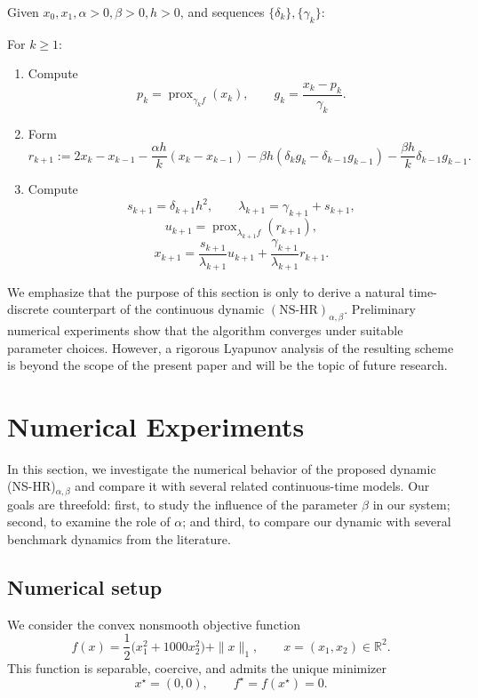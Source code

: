 \documentclass[11pt]{article}
\numberwithin{equation}{section}
\begin{document}
Given $x_0,x_1, \alpha>0, \beta>0, h>0$, and sequences $\{\delta_k\},\{\gamma_k\}$:

For $k\ge1$:

\begin{enumerate}
\item Compute
\[
p_k
=
\operatorname{prox}_{\gamma_k f}(x_k),
\qquad
g_k
=
\frac{x_k-p_k}{\gamma_k}.
\]

\item Form
\[
r_{k+1}
:=
2x_k-x_{k-1}
-\frac{\alpha h}{k}(x_k-x_{k-1})
-\beta h(\delta_k g_k-\delta_{k-1}g_{k-1})-\frac{\beta h}{k}\delta_{k-1}g_{k-1}.
\]

\item Compute
\[
s_{k+1}
=
\delta_{k+1}h^2,
\qquad
\lambda_{k+1}
=
\gamma_{k+1}+s_{k+1},
\]
\[
u_{k+1}
=
\operatorname{prox}_{\lambda_{k+1}f}(r_{k+1}),
\]
\[
x_{k+1}
=
\frac{s_{k+1}}{\lambda_{k+1}}u_{k+1}
+
\frac{\gamma_{k+1}}{\lambda_{k+1}}r_{k+1}.
\]
\end{enumerate}
We emphasize that the purpose of this section is only to derive a natural time-discrete counterpart of the continuous dynamic \((\mathrm{NS\text{-}HR})_{\alpha,\beta}\). Preliminary numerical experiments show that the algorithm converges under suitable parameter choices. However, a rigorous Lyapunov analysis of the resulting scheme is beyond the scope of the present paper and will be the topic of  future research.
\section{Numerical Experiments}

In this section, we investigate the numerical behavior of the proposed dynamic (NS-HR)$_{\alpha,\beta}$ and compare it with several related continuous-time models. Our goals are threefold: first, to study the influence of the parameter $\beta$ in our system; second, to examine the role of $\alpha$; and third, to compare our dynamic with several benchmark dynamics from the literature.

\subsection{Numerical setup}

We consider the convex nonsmooth objective function
\begin{equation}
\label{eq:num-f}
f(x)=\frac12\bigl(x_1^2+1000x_2^2\bigr)+\|x\|_1,
\qquad x=(x_1,x_2)\in\mathbb{R}^2.
\end{equation}
This function is separable, coercive, and admits the unique minimizer
\[
x^\star=(0,0),
\qquad
f^\star=f(x^\star)=0.
\]
\end{document}
